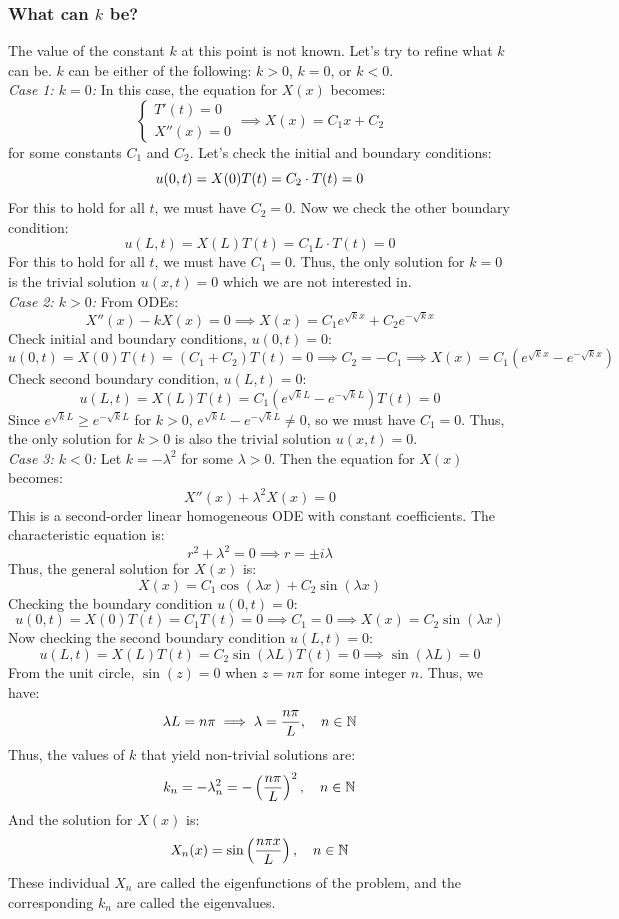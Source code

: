 \subsubsection{What can $k$ be?}\label{subsubsec.k_values}
The value of the constant $k$ at this point is not known. Let's try to refine what $k$ can be. $k$ can be either of the following: $k >0$, $k=0$, or $k<0$. \\
\textit{Case 1: $k = 0$:}
In this case, the equation for $X(x)$ becomes:
\[
\begin{cases}
    T'(t) = 0 \\
    X''(x) = 0
\end{cases}
\implies 
    X(x) = C_1 x + C_2
\]
for some constants $C_1$ and $C_2$. Let's check the initial and boundary conditions:
\[
u(0,t) = X(0)T(t) = C_2 \cdot T(t) = 0 \\
\]
For this to hold for all $t$, we must have $C_2 = 0$. Now we check the other boundary condition:
\[
u(L,t) = X(L)T(t) = C_1 L \cdot T(t) = 0
\]
For this to hold for all $t$, we must have $C_1 = 0$. Thus, the only solution for $k=0$ is the trivial solution $u(x,t) = 0$ which we are not interested in.\\
\textit{Case 2: $k > 0$:}
From ODEs:
\[
X''(x) - k X(x) = 0
\implies 
X(x) = C_1 e^{\sqrt{k} x} + C_2 e^{-\sqrt{k} x}
\]
Check initial and boundary conditions, $u(0,t)=0$:
\[
u(0,t) = X(0)T(t) = (C_1 + C_2)T(t) = 0
\implies C_2 = -C_1 \implies
X(x) = C_1 (e^{\sqrt{k} x} - e^{-\sqrt{k} x}) 
\]
Check second boundary condition, $u(L,t)=0$:
\[
u(L,t) = X(L)T(t) = C_1 (e^{\sqrt{k} L} - e^{-\sqrt{k} L}) T(t) = 0
\]
Since $e^{\sqrt{k} L} \geq e^{-\sqrt{k} L}$ for $k > 0$, $e^{\sqrt{k} L} - e^{-\sqrt{k} L} \neq 0$, so we must have $C_1 = 0$. Thus, the only solution for $k > 0$ is also the trivial solution $u(x,t) = 0$.\\
\textit{Case 3: $k < 0$:}
Let $k = -\lambda^2$ for some $\lambda > 0$. Then the equation for $X(x)$ becomes:
\[
X''(x) + \lambda^2 X(x) = 0
\]
This is a second-order linear homogeneous ODE with constant coefficients. The characteristic equation is:
\[
r^2 + \lambda^2 = 0
\implies r = \pm i \lambda
\]
Thus, the general solution for $X(x)$ is:
\[
X(x) = C_1 \cos(\lambda x) + C_2 \sin(\lambda x)
\]
Checking the boundary condition $u(0,t) = 0$:
\[
u(0,t) = X(0)T(t) = C_1 T(t) = 0
\implies C_1 = 0 \implies X(x) = C_2 \sin(\lambda x)
\]
Now checking the second boundary condition $u(L,t) = 0$:
\[
u(L,t) = X(L)T(t) = C_2 \sin(\lambda L) T(t) = 0
\implies \sin(\lambda L) = 0
\]
From the unit circle, $\sin (z) = 0$ when $z = n\pi$ for some integer $n$. Thus, we have:
\[
\lambda L = n \pi \implies \lambda = \frac{n \pi}{L}, \quad n \in \mathbb{N}
\]
Thus, the values of $k$ that yield non-trivial solutions are:
\[
k_n = -\lambda_n^2 = -\left(\frac{n \pi}{L}\right)^2, \quad n \in \mathbb{N}
\]
And the solution for $X(x)$ is:
\[
X_n(x) = \sin\left(\frac{n \pi x}{L}\right), \quad n \in \mathbb{N}
\]
These individual $X_n$ are called the eigenfunctions of the problem, and the corresponding $k_n$ are called the eigenvalues.

